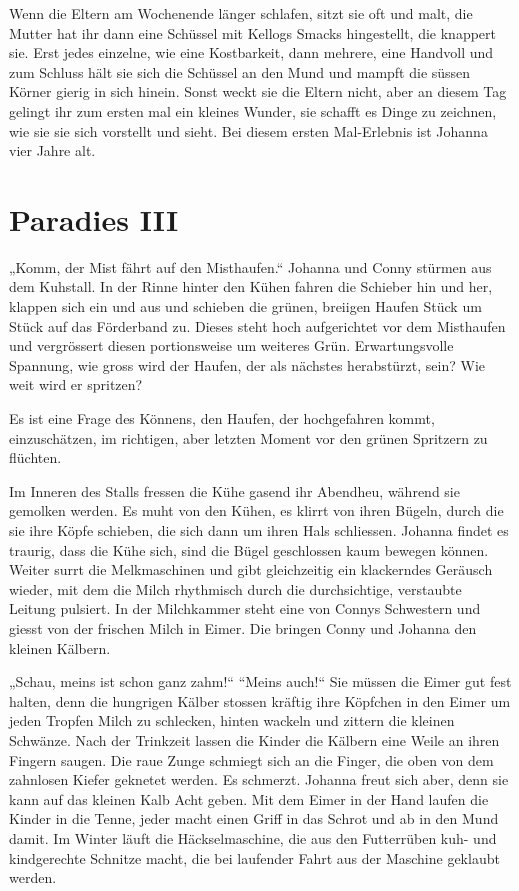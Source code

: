 Wenn die Eltern am Wochenende länger schlafen, sitzt sie oft und malt, die Mutter hat ihr dann eine Schüssel mit Kellogs Smacks hingestellt, die knappert sie. Erst jedes einzelne, wie eine Kostbarkeit, dann mehrere, eine Handvoll und zum Schluss hält sie sich die Schüssel an den Mund und mampft die süssen Körner gierig in sich hinein. Sonst weckt sie die Eltern nicht, aber an diesem Tag gelingt ihr zum ersten mal ein kleines Wunder, sie schafft es Dinge zu zeichnen, wie sie sie sich vorstellt und sieht. Bei diesem ersten Mal-Erlebnis ist Johanna vier Jahre alt.



\section*{Paradies III}



„Komm, der Mist fährt auf den Misthaufen.“ Johanna und Conny stürmen aus dem Kuhstall. In der Rinne hinter den Kühen fahren die Schieber hin und her, klappen sich ein und aus und schieben die grünen, breiigen Haufen Stück um Stück auf das Förderband zu. Dieses steht hoch aufgerichtet vor dem Misthaufen und vergrössert diesen portionsweise um weiteres Grün.
Erwartungsvolle Spannung, wie gross wird der Haufen, der als nächstes herabstürzt, sein? Wie weit wird er spritzen?

Es ist eine Frage des Könnens, den Haufen, der hochgefahren kommt, einzuschätzen, im richtigen, aber letzten Moment vor den grünen Spritzern zu flüchten.

Im Inneren des Stalls fressen die Kühe gasend ihr Abendheu, während sie gemolken werden. Es muht von den Kühen, es klirrt von ihren Bügeln, durch die sie ihre Köpfe schieben, die sich dann um ihren Hals schliessen. Johanna findet es traurig, dass die Kühe sich, sind die Bügel geschlossen kaum bewegen können. Weiter surrt die Melkmaschinen und gibt gleichzeitig ein klackerndes Geräusch wieder, mit dem die Milch rhythmisch durch die durchsichtige, verstaubte Leitung pulsiert. In der Milchkammer steht eine von Connys Schwestern und giesst von der frischen Milch in Eimer. Die bringen Conny und Johanna den kleinen Kälbern. 

„Schau, meins ist schon ganz zahm!“ “Meins auch!“ Sie müssen die Eimer gut fest halten, denn die hungrigen Kälber stossen kräftig ihre Köpfchen in den Eimer um jeden Tropfen Milch zu schlecken, hinten wackeln und zittern die kleinen Schwänze. Nach der Trinkzeit lassen die Kinder die Kälbern eine Weile an ihren Fingern saugen. Die raue Zunge schmiegt sich an die Finger, die oben von dem zahnlosen Kiefer geknetet werden. Es schmerzt. Johanna freut sich aber, denn sie kann auf  das kleinen Kalb Acht geben. Mit dem Eimer in der Hand laufen die Kinder in die Tenne, jeder macht einen Griff in das Schrot und ab in den Mund damit. Im Winter läuft die Häckselmaschine, die aus den Futterrüben kuh- und kindgerechte Schnitze macht, die bei laufender Fahrt aus der Maschine geklaubt werden.



